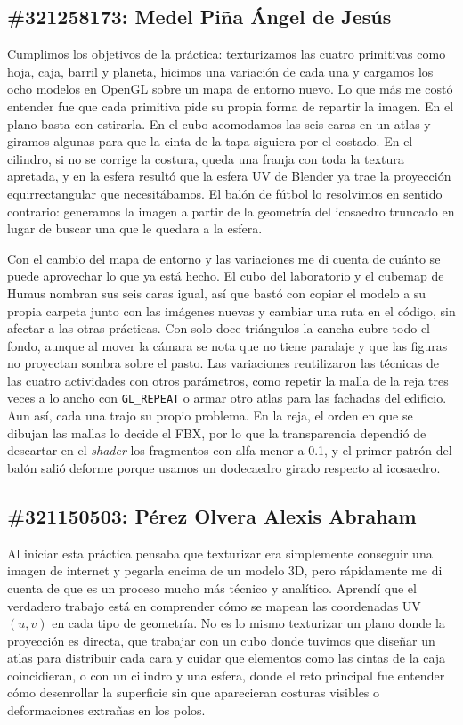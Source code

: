 \subsection*{\#321258173: Medel Piña Ángel de Jesús}
Cumplimos los objetivos de la práctica: texturizamos las cuatro primitivas como hoja, caja, barril y planeta, hicimos una variación de cada una y cargamos los ocho modelos en OpenGL sobre un mapa de entorno nuevo. Lo que más me costó entender fue que cada primitiva pide su propia forma de repartir la imagen. En el plano basta con estirarla. En el cubo acomodamos las seis caras en un atlas y giramos algunas para que la cinta de la tapa siguiera por el costado. En el cilindro, si no se corrige la costura, queda una franja con toda la textura apretada, y en la esfera resultó que la esfera UV de Blender ya trae la proyección equirrectangular que necesitábamos. El balón de fútbol lo resolvimos en sentido contrario: generamos la imagen a partir de la geometría del icosaedro truncado en lugar de buscar una que le quedara a la esfera.

Con el cambio del mapa de entorno y las variaciones me di cuenta de cuánto se puede aprovechar lo que ya está hecho. El cubo del laboratorio y el cubemap de Humus nombran sus seis caras igual, así que bastó con copiar el modelo a su propia carpeta junto con las imágenes nuevas y cambiar una ruta en el código, sin afectar a las otras prácticas. Con solo doce triángulos la cancha cubre todo el fondo, aunque al mover la cámara se nota que no tiene paralaje y que las figuras no proyectan sombra sobre el pasto. Las variaciones reutilizaron las técnicas de las cuatro actividades con otros parámetros, como repetir la malla de la reja tres veces a lo ancho con \texttt{GL\_REPEAT} o armar otro atlas para las fachadas del edificio. Aun así, cada una trajo su propio problema. En la reja, el orden en que se dibujan las mallas lo decide el FBX, por lo que la transparencia dependió de descartar en el \textit{shader} los fragmentos con alfa menor a 0.1, y el primer patrón del balón salió deforme porque usamos un dodecaedro girado respecto al icosaedro.



\subsection*{\#321150503: Pérez Olvera Alexis Abraham}
Al iniciar esta práctica pensaba que texturizar era simplemente conseguir una imagen de internet y pegarla encima de un modelo 3D, pero rápidamente me di cuenta de que es un proceso mucho más técnico y analítico. Aprendí que el verdadero trabajo está en comprender cómo se mapean las coordenadas UV $(u, v)$ en cada tipo de geometría. No es lo mismo texturizar un plano donde la proyección es directa, que trabajar con un cubo donde tuvimos que diseñar un atlas para distribuir cada cara y cuidar que elementos como las cintas de la caja coincidieran, o con un cilindro y una esfera, donde el reto principal fue entender cómo desenrollar la superficie sin que aparecieran costuras visibles o deformaciones extrañas en los polos.

